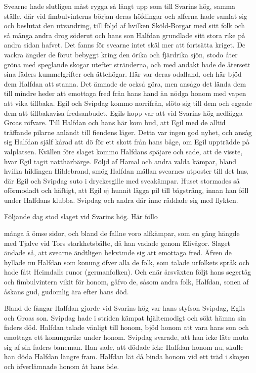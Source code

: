 Svearne hade slutligen måst rygga så långt upp som till Svarins hög,
samma ställe, där vid fimbulvinterns början deras höfdingar och alferna
hade samlat sig och beslutat den utvandring, till följd af hvilken
Sköld-Borgar med sitt folk och så många andra drog söderut och hans son
Halfdan grundlade sitt stora rike på andra sidan hafvet. Det fanns för
svearne intet skäl mer att fortsätta kriget. De vackra ängder de förut
bebyggt kring den örika och fjärdrika sjön, stodo åter gröna med
speglande skogar utefter stränderna, och med andakt hade de återsett
sina fäders kummelgrifter och ättehögar. Här var deras odalland, och här
bjöd dem Halfdan att stanna. Det ämnade de också göra, men ansågo det
lända dem till mindre heder att emottaga fred från hans hand än nödga
honom med vapen att vika tillbaka. Egil och Svipdag kommo norrifrån,
slöto sig till dem och eggade dem att tillbakavisa fredsanbudet. Egils
hopp var att vid Svarins hög nedlägga Groas röfvare. Till Halfdan och
hans här kom bud, att Egil med de alltid träffande pilarne anländt till
fiendens läger. Detta var ingen god nyhet, och ansåg sig Halfdan själf
kårad att dö för ett skott från hans båge, om Egil uppträdde på
valplatsen. Kvällen före slaget kommo Halfdans späjare och sade, att de
visste, hvar Egil tagit natthärbärge. Följd af Hamal och andra valda
kämpar, bland hvilka hildingen Hildebrand, smög Halfdan mällan svearnes
utposter till det hus, där Egil och Svipdag suto i dryckesgille med
sveakämpar. Huset stormades så oförmodadt och häftigt, att Egil ej
hunnit lägga pil till bågsträng, innan han föll under Halfdans klubba.
Svipdag och andra där inne räddade sig med flykten.

Följande dag stod slaget vid Svarins hög. Här föllo

många å ömse sidor, och bland de fallne voro alfkämpar, som en gång
hängde med Tjalve vid Tors starkhetsbälte, då han vadade genom Elivågor.
Slaget ändade så, att svearne ändtligen bekvämde sig att emottaga fred.
Äfven de hyllade nu Halfdan som konung öfver alla de folk, som talade
urfolkets språk och hade fått Heimdalls runor (germanfolken). Och enär
årsväxten följt hans segertåg och fimbulvintern vikit för honom, gåfvo
de, såsom andra folk, Halfdan, sonen af åskans gud, gudomlig ära efter
hans död.

Bland de fångar Halfdan gjorde vid Svarins hög var hans styfson Svipdag,
Egils och Groas son. Svipdag hade i striden kämpat hjältemodigt och sökt
hämna sin faders död. Halfdan talade vänligt till honom, bjöd honom att
vara hans son och emottaga ett konungarike under honom. Svipdag svarade,
att han icke läte muta sig af sin faders baneman. Han sade, att dödade
icke Halfdan honom nu, skulle han döda Halfdan längre fram. Halfdan lät
då binda honom vid ett träd i skogen och öfverlämnade honom åt hans öde.

